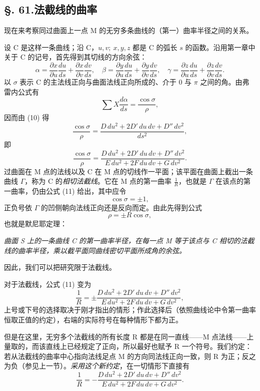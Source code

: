\subsection*{\S. 61.\quad 法截线的曲率}

现在来考察同过曲面上一点 M 的无穷多条曲线的（第一）曲率半径之间的关系。

设 C 是这样一条曲线；沿 C，\(u,v;\ x,y,z\) 都是 C 的弧长 \(s\) 的函数。沿用第一章中关于 C 的记号，首先得到其切线的方向余弦：
\begin{equation}\tag{10}
 \alpha=\frac{\partial x}{\partial u}\frac{du}{ds}
 +\frac{\partial x}{\partial v}\frac{dv}{ds},\quad
 \beta=\frac{\partial y}{\partial u}\frac{du}{ds}
 +\frac{\partial y}{\partial v}\frac{dv}{ds},\quad
 \gamma=\frac{\partial z}{\partial u}\frac{du}{ds}
 +\frac{\partial z}{\partial v}\frac{dv}{ds}.
\end{equation}
以 \(\sigma\) 表示 C 的主法线正向与曲面法线正向所成的、介于 0 与 \(\pi\) 之间的角。由弗雷内公式有
\[
 \sum X\frac{d\alpha}{ds}=\frac{\cos\sigma}{\rho},
\]
因而由 (10) 得
\[
 \frac{\cos\sigma}{\rho}
 =
 \frac{D\,du^2+2D'\,du\,dv+D''\,dv^2}{ds^2},
\]
即
\begin{equation}\tag{11}
 \frac{\cos\sigma}{\rho}
 =
 \frac{D\,du^2+2D'\,du\,dv+D''\,dv^2}
 {E\,du^2+2F\,du\,dv+G\,dv^2}.
\end{equation}
过曲面在 M 点的法线以及 C 在 M 点的切线作一平面；该平面在曲面上截出一条曲线 \(\Gamma\)，称为 C 的\emph{相切法截线}。它在 M 点的第一曲率 \(\frac{1}{R}\)，也就是 \(\Gamma\) 在该点的第一曲率，仍由公式 (11) 给出，其中应令
\[
 \cos\sigma=\pm1,
\]
正负号依 \(\Gamma\) 的凹侧朝向法线正向还是反向而定。由此先得到公式
\[
 \rho=\pm R\cos\sigma,
\]
也就是默尼耶定理：

\emph{曲面 S 上的一条曲线 C 的第一曲率半径，在每一点 M 等于该点与 C 相切的法截线的曲率半径，乘以截平面同曲线密切平面所成角的余弦。}

因此，我们可以把研究限于法截线。

对于法截线，公式 (11) 变为
\[
 \frac{1}{R}=\pm
 \frac{D\,du^2+2D'\,du\,dv+D''\,dv^2}
 {E\,du^2+2F\,du\,dv+G\,dv^2},
\]
上号或下号的选择取决于刚才指出的情形；作此选择后（依照曲线论中令第一曲率恒取正值的约定），右端的实际符号在每种情形下都为正。

但是在这里，无穷多个法截线的所有长度 R 都是在同一直线——M 点法线——上量取的，而该直线上已经规定了正向，所以最好也赋予 R 一个符号。我们约定：若从法截线的曲率中心指向法线足点 M 的方向同法线正向一致，则 R 为正；反之为负（参见上一节）。\emph{采用这个新约定}，在一切情形下直接有
\begin{equation}\tag{12}
 \frac{1}{R}=-
 \frac{D\,du^2+2D'\,du\,dv+D''\,dv^2}
 {E\,du^2+2F\,du\,dv+G\,dv^2}.
\end{equation}

